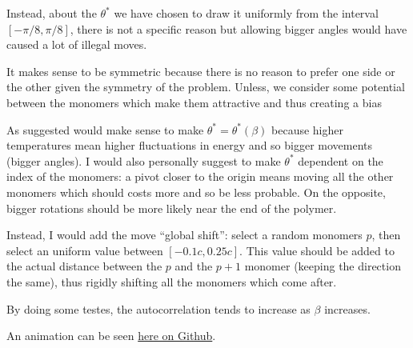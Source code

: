 \documentclass[../main.tex]{subfiles}
\begin{document}
Instead, about the $\theta^*$ we have chosen to draw it uniformly from the interval $[-\pi/8, \pi/8]$, there is not a specific reason but allowing bigger angles would have caused a lot of illegal moves.

It makes sense to be symmetric because there is no reason to prefer one side or the other given the symmetry of the problem. Unless, we consider some potential between the monomers which make them attractive and thus creating a bias 

As suggested would make sense to make $\theta^* = \theta^*(\beta)$ because higher temperatures mean higher fluctuations in energy and so bigger movements (bigger angles). I would also personally suggest to make $\theta^*$ dependent on the index of the monomers: a pivot closer to the origin means moving all the other monomers which should costs more and so be less probable. On the opposite, bigger rotations should be more likely near the end of the polymer.

Instead, I would add the move ``global shift'': select a random monomers $p$, then select an uniform value between $[-0.1c, 0.25c]$. This value should be added to the actual distance between the $p$ and the $p+1$ monomer (keeping the direction the same), thus rigidly shifting all the monomers which come after. 

By doing some testes, the autocorrelation tends to increase as $\beta$ increases.


An animation can be seen \href{https://github.com/EmanueleSarte/nmsm/blob/main/ex6/README.md}{here on Github}. 
\end{document}
